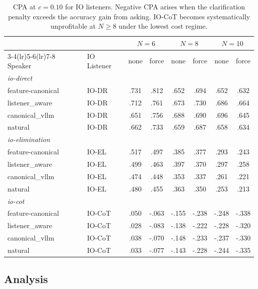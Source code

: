 \documentclass[11pt]{article}
\begin{document}
\begin{table}[ht]
\centering
\small
\setlength{\tabcolsep}{4pt}
\begin{tabular}{llcccccc}
\toprule
 & & \multicolumn{2}{c}{$N{=}6$} & \multicolumn{2}{c}{$N{=}8$} &
     \multicolumn{2}{c}{$N{=}10$} \\
\cmidrule(lr){3-4}\cmidrule(lr){5-6}\cmidrule(lr){7-8}
Speaker & IO Listener & none & force & none & force & none & force \\
\midrule
\multicolumn{8}{l}{\textit{io-direct}} \\
feature-canonical   & IO-DR & .731 & .812 & .652 & .694 & .652 & .632 \\
listener\_aware     & IO-DR & .712 & .761 & .673 & .730 & .686 & .664 \\
canonical\_vllm     & IO-DR & .651 & .756 & .688 & .690 & .696 & .645 \\
natural             & IO-DR & .662 & .733 & .659 & .687 & .658 & .634 \\
\midrule
\multicolumn{8}{l}{\textit{io-elimination}} \\
feature-canonical   & IO-EL & .517 & .497 & .385 & .377 & .293 & .243 \\
listener\_aware     & IO-EL & .499 & .463 & .397 & .370 & .297 & .258 \\
canonical\_vllm     & IO-EL & .474 & .448 & .353 & .337 & .261 & .221 \\
natural             & IO-EL & .480 & .455 & .363 & .350 & .253 & .213 \\
\midrule
\multicolumn{8}{l}{\textit{io-cot}} \\
feature-canonical   & IO-CoT & .050 & -.063 & -.155 & -.238 & -.248 & -.338 \\
listener\_aware     & IO-CoT & .028 & -.083 & -.138 & -.222 & -.228 & -.320 \\
canonical\_vllm     & IO-CoT & .038 & -.070 & -.148 & -.233 & -.237 & -.330 \\
natural             & IO-CoT & .033 & -.077 & -.143 & -.228 & -.244 & -.335 \\
\bottomrule
\end{tabular}
\caption{CPA at $c{=}0.10$ for IO listeners.
         Negative CPA arises when the clarification penalty exceeds the accuracy
         gain from asking.  IO-CoT becomes systematically unprofitable at
         $N \geq 8$ under the lowest cost regime.}
\label{tab:io-c01}
\end{table}

\subsection{Analysis}
\end{document}

